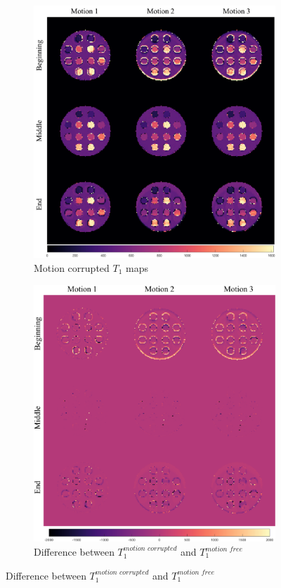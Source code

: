 \begin{figure}[ht]
    \centering
    \begin{subfigure}[b]{.65\textwidth}
        \includegraphics[width=\textwidth]{images/mrf/T1mapsmotion}
        \caption{Motion corrupted $T_1$ maps}
    \end{subfigure}
    
    \begin{subfigure}[b]{.65\textwidth}
        \includegraphics[width=\textwidth]{images/mrf/T1SimuMinusT1Real}
        \caption{Difference between $T_1^{motion \, \, corrupted}$ and $T_1^{motion \, \, free}$}
    \end{subfigure}
    

\end{figure}
